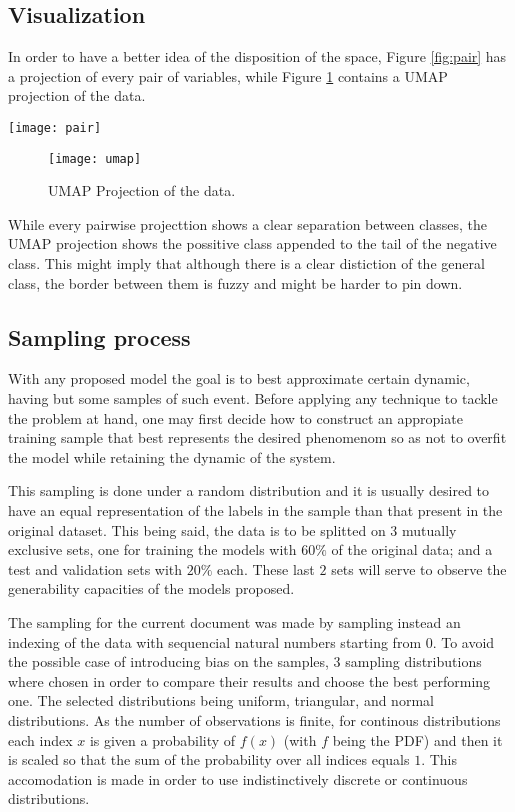 \subsection{Visualization}

In order to have a better idea of the disposition of the space,
Figure \ref{fig:pair} has a projection of every pair of variables, while
Figure \ref{fig:umap} contains a UMAP projection of the data.

\begin{figure*}[ht]
    \texttt{[image: pair]}
    \caption{Pairwise projection of the data. \label{fig:pair}}
\end{figure*}

\begin{figure}[ht]
    \texttt{[image: umap]}
    \caption{UMAP Projection of the data. \label{fig:umap}}
\end{figure}

While every pairwise projecttion shows a clear separation between classes, the
UMAP projection shows the possitive class appended to the tail of the negative
class. This might imply that although there is a clear distiction of the general
class, the border between them is fuzzy and might be harder to pin down.

\subsection{Sampling process\label{sec:sample}}

With any proposed model the goal is to best approximate certain dynamic, having
but some samples of such event. Before applying any technique to tackle the
problem at hand, one may first decide how to construct an appropiate training
sample that best represents the desired phenomenom so as not to overfit the
model while retaining the dynamic of the system.

This sampling is done under a random distribution and it is usually desired to
have an equal representation of the labels in the sample than that present in
the original dataset. This being said, the data is to be splitted on $3$
mutually exclusive sets, one for training the models with $60\%$ of the original
data; and a test and validation sets with $20\%$ each. These last $2$ sets will
serve to observe the generability capacities of the models proposed.

The sampling for the current document was made by sampling instead an indexing
of the data with sequencial natural numbers starting from 0. To avoid the
possible case of introducing bias on the samples, $3$ sampling distributions
where chosen in order to compare their results and choose the best performing
one. The selected distributions being uniform, triangular, and normal
distributions. As the number of observations is finite, for continous
distributions each index $x$ is given a probability of $f(x)$ (with $f$ being
the PDF) and then it is scaled so that the sum of the probability over all
indices equals $1$. This accomodation is made in order to use indistinctively
discrete or continuous distributions.

